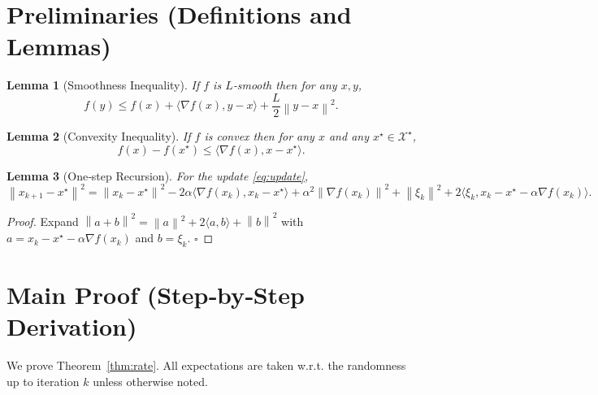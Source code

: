 \documentclass{article}
\newtheorem{lemma}{Lemma}
\newcommand{\norm}[1]{\left\lVert #1\right\rVert}
\newcommand{\ip}[2]{\langle #1,#2\rangle}
\begin{document}
\section*{Preliminaries (Definitions and Lemmas)}
\begin{lemma}[Smoothness Inequality]\label{lem:smooth}
If $f$ is $L$‑smooth then for any $x,y$,
\[
f(y)\le f(x)+\ip{\nabla f(x)}{y-x}+\frac{L}{2}\norm{y-x}^2.
\]
\end{lemma}
\begin{lemma}[Convexity Inequality]\label{lem:convex}
If $f$ is convex then for any $x$ and any $x^\star\in\mathcal{X}^\star$,
\[
f(x)-f(x^\star)\le \ip{\nabla f(x)}{x-x^\star}.
\]
\end{lemma}
\begin{lemma}[One‑step Recursion]\label{lem:one_step}
For the update \eqref{eq:update},
\[
\norm{x_{k+1}-x^\star}^2
 = \norm{x_k-x^\star}^2
 -2\alpha\ip{\nabla f(x_k)}{x_k-x^\star}
 +\alpha^2\norm{\nabla f(x_k)}^2
 +\norm{\xi_k}^2
 +2\ip{\xi_k}{x_k-x^\star-\alpha\nabla f(x_k)} .
\]
\end{lemma}
\begin{proof}
Expand $\norm{a+b}^2=\norm{a}^2+2\ip{a}{b}+\norm{b}^2$ with $a=x_k-x^\star-\alpha\nabla f(x_k)$ and $b=\xi_k$. $\square$
\end{proof}

\section*{Main Proof (Step‑by‑Step Derivation)}
We prove Theorem~\ref{thm:rate}. All expectations are taken w.r.t. the randomness up to iteration $k$ unless otherwise noted.
\end{document}
